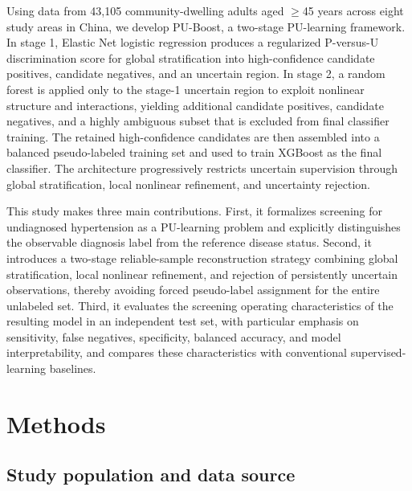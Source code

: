 \documentclass[10pt]{article}
\begin{document}
Using data from 43,105 community-dwelling adults aged $\geq$45 years across
eight study areas in China, we develop PU-Boost, a two-stage PU-learning
framework. In stage 1, Elastic Net logistic regression produces a
regularized P-versus-U discrimination score for global stratification
into high-confidence candidate positives, candidate negatives, and an
uncertain region. In stage 2, a random forest is applied only to the
stage-1 uncertain region to exploit nonlinear structure and
interactions, yielding additional candidate positives, candidate
negatives, and a highly ambiguous subset that is excluded from final
classifier training. The retained high-confidence candidates are then
assembled into a balanced pseudo-labeled training set and used to train
XGBoost as the final classifier. The architecture progressively
restricts uncertain supervision through global stratification, local
nonlinear refinement, and uncertainty rejection.

This study makes three main contributions. First, it formalizes
screening for undiagnosed hypertension as a PU-learning problem and
explicitly distinguishes the observable diagnosis label from the
reference disease status. Second, it introduces a two-stage
reliable-sample reconstruction strategy combining global stratification,
local nonlinear refinement, and rejection of persistently uncertain
observations, thereby avoiding forced pseudo-label assignment for the
entire unlabeled set. Third, it evaluates the screening operating
characteristics of the resulting model in an independent test set, with
particular emphasis on sensitivity, false negatives, specificity,
balanced accuracy, and model interpretability, and compares these
characteristics with conventional supervised-learning baselines.

\section{Methods}

\subsection{Study population and data
source}\label{study-population-and-data-source}
\end{document}
